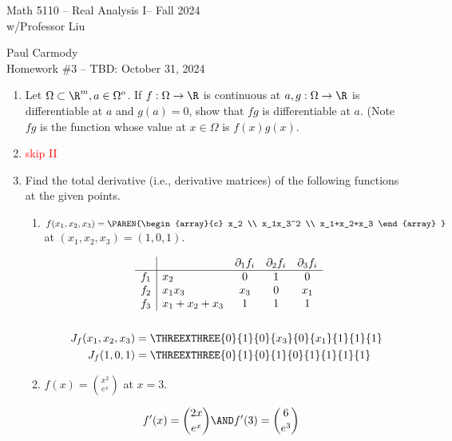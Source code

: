 \documentclass[10pt,a4paper]{report}
\newcommand{\CLASSNAME}{Math 5110 -- Real Analysis I}
\newcommand{\STUDENTNAME}{Paul Carmody}
\newcommand{\ASSIGNMENT}{Homework \#3 }
\newcommand{\DUEDATE}{TBD: October 31, 2024}
\newcommand{\SEMESTER}{Fall 2024}
\newcommand{\RED}[1]{\textcolor{red}{#1}}
\newcommand{\BLUE}[1]{\textcolor{blue}{#1}}
\begin{document}
\begin{center}
	\Large{\CLASSNAME -- \SEMESTER} \\
	\large{ w/Professor Liu}
\end{center}
\begin{center}
	\STUDENTNAME \\
	\ASSIGNMENT -- \DUEDATE\\
\end{center} 

\begin{enumerate}[label=\Roman*.]
\item Let $\Omega \subset \R^m, a \in \Omega^o$.  If $f:\Omega \to \R$ is continuous at $a, g: \Omega \to \R$ is differentiable at $a$ and $g(a) = 0$, show that $fg$ is differentiable at $a$.  (Note $fg$ is the function whose value at $x \in \Omega$ is $f(x)g(x)$.

\item \RED{skip II}

\item Find the total derivative (i.e., derivative matrices) of the following functions at the given points.
\begin{enumerate}[label=(\alph*)]
	\item $f(x_1,x_2,x_3) = \PAREN{\begin{array}{c}
		x_2 \\ 
		x_1x_3^2 \\
		x_1+x_2+x_3
	\end{array} }$ at $(x_1,x_2,x_3) = (1,0,1)$.
	
	\BLUE{\begin{align*}
		&\begin{array}{c|lccc}
			& & \partial_1 f_i & \partial_2 f_i & \partial_3 f_i\\ \hline
			f_1 & x_2 & 0 & 1 & 0\\
			f_2 & x_1x_3 & x_3 & 0 & x_1 \\
			f_3 & x_1+x_2+x_3 & 1 & 1 & 1
		\end{array} \\ \\
		J_f(x_1, x_2, x_3) &= \THREEXTHREE{0}{1}{0}{x_3}{0}{x_1}{1}{1}{1} \\
		J_f(1,0,1) &= \THREEXTHREE{0}{1}{0}{1}{0}{1}{1}{1}{1}
	\end{align*}
	}
	
	\item $f(x) = \binom{x^2}{e^x}$ at $x=3$.
	
	\BLUE{\begin{align*}
		f'(x) &= \binom{2x}{e^x} \AND f'(3) = \binom{6}{e^3}
\end{align*}	
	}
	

\end{enumerate}
\end{enumerate}
\end{document}

